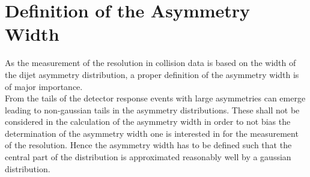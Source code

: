 \section{Definition of the Asymmetry Width}
\label{sec:jer_asymm_width_def}
As the measurement of the resolution in collision data is based on the width of the dijet asymmetry distribution, a proper definition of the asymmetry width is of major importance.\\
From the tails of the detector response events with large asymmetries can emerge leading to non-gaussian tails in the asymmetry distributions. These shall not be considered in the calculation of the asymmetry width in order to not bias the determination of the asymmetry width one is interested in for the measurement of the resolution. Hence the asymmetry width has to be defined such that the central part of the distribution is approximated reasonably well by a gaussian distribution. 
